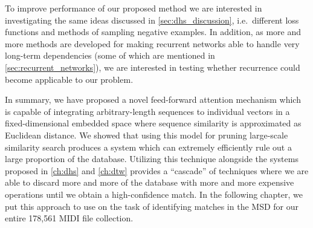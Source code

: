 To improve performance of our proposed method we are interested in investigating the same ideas discussed in \cref{sec:dhs_discussion}, i.e.\ different loss functions and methods of sampling negative examples.
In addition, as more and more methods are developed for making recurrent networks able to handle very long-term dependencies (some of which are mentioned in \cref{sec:recurrent_networks}), we are interested in testing whether recurrence could become applicable to our problem.

In summary, we have proposed a novel feed-forward attention mechanism which is capable of integrating arbitrary-length sequences to individual vectors in a fixed-dimensional embedded space where sequence similarity is approximated as Euclidean distance.
We showed that using this model for pruning large-scale similarity search produces a system which can extremely efficiently rule out a large proportion of the database.
Utilizing this technique alongside the systems proposed in \cref{ch:dhs} and \cref{ch:dtw} provides a ``cascade'' of techniques where we are able to discard more and more of the database with more and more expensive operations until we obtain a high-confidence match.
In the following chapter, we put this approach to use on the task of identifying matches in the MSD for our entire 178,561 MIDI file collection.
